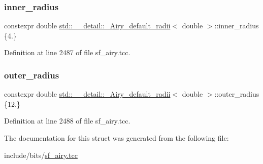 \subsubsection{\texorpdfstring{inner\+\_\+radius}{inner\_radius}}
{\footnotesize\ttfamily constexpr double \hyperlink{structstd_1_1____detail_1_1__Airy__default__radii}{std\+::\+\_\+\+\_\+detail\+::\+\_\+\+Airy\+\_\+default\+\_\+radii}$<$ double $>$\+::inner\+\_\+radius \{4.\}\hspace{0.3cm}{\ttfamily [static]}}



Definition at line 2487 of file sf\+\_\+airy.\+tcc.

\mbox{\label{structstd_1_1____detail_1_1__Airy__default__radii_3_01double_01_4_a0d0c981d84c034afb18aa533bd6a9a52}} 
\subsubsection{\texorpdfstring{outer\+\_\+radius}{outer\_radius}}
{\footnotesize\ttfamily constexpr double \hyperlink{structstd_1_1____detail_1_1__Airy__default__radii}{std\+::\+\_\+\+\_\+detail\+::\+\_\+\+Airy\+\_\+default\+\_\+radii}$<$ double $>$\+::outer\+\_\+radius \{12.\}\hspace{0.3cm}{\ttfamily [static]}}



Definition at line 2488 of file sf\+\_\+airy.\+tcc.



The documentation for this struct was generated from the following file\+:\begin{DoxyCompactItemize}
\item 
include/bits/\hyperlink{sf__airy_8tcc}{sf\+\_\+airy.\+tcc}\end{DoxyCompactItemize}
